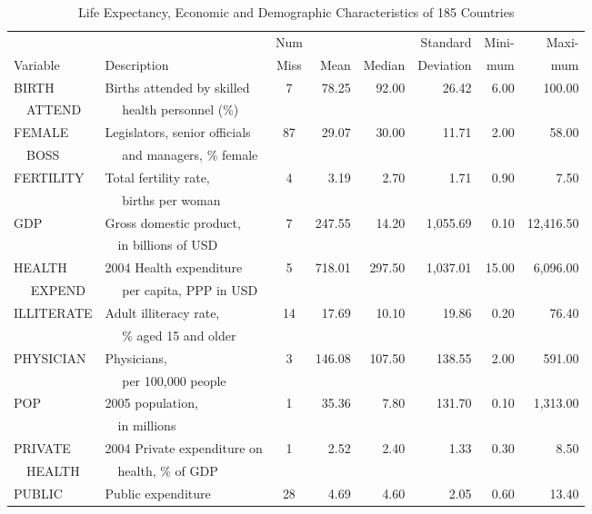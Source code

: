 \begin{exercises}
\begin{table}[h]
 \caption{\label{Ex:UNLIFESummStats} \small Life
Expectancy, Economic and Demographic Characteristics of 185
Countries}
\begin{tabular}{ll|crrrrr}
\hline
&  & Num &        &     & Standard  &   Mini- &  Maxi- \\
  Variable     & Description & Miss &    Mean    &    Median   & Deviation &    mum &    mum \\\hline
BIRTH & Births attended  by skilled &          7 &      78.25 &      92.00 &      26.42 &       6.00 &     100.00 \\
 ~~ATTEND& ~~ health personnel (\%)\\
FEMALE & Legislators, senior officials &         87 &      29.07 &      30.00 &      11.71 &       2.00 &      58.00 \\
 ~~BOSS& ~~ and managers, \% female \\
 FERTILITY & Total fertility rate,&          4 &       3.19 &       2.70 &       1.71 &       0.90 &       7.50 \\
 & ~~ births per woman &          \\
       GDP & Gross domestic product, &          7 &     247.55 &      14.20 &   1,055.69 &       0.10 &  12,416.50 \\
       & ~~in billions of USD \\
HEALTH& 2004 Health expenditure &          5 &     718.01 &     297.50 &   1,037.01 &      15.00 &   6,096.00 \\
~~ EXPEND & ~~ per capita, PPP in USD \\
ILLITERATE & Adult illiteracy rate,  &         14 &      17.69 &      10.10 &      19.86 &       0.20 &      76.40 \\
  & ~~ \% aged 15 and older &      \\
 PHYSICIAN & Physicians,&          3 &     146.08 &     107.50 &     138.55 &       2.00 &     591.00 \\
 & ~~ per 100,000 people \\
       POP & 2005 population, &          1 &      35.36 &       7.80 &     131.70 &       0.10 &   1,313.00 \\
       & ~~in millions \\
PRIVATE & 2004 Private expenditure on  &          1 &       2.52 &       2.40 &       1.33 &       0.30 &       8.50 \\
~~HEALTH& ~~health, \% of GDP  \\
PUBLIC & Public expenditure  &         28 &       4.69 &       4.60 &       2.05 &       0.60 &      13.40 \\

\end{tabular}
\end{table}
\end{exercises}
